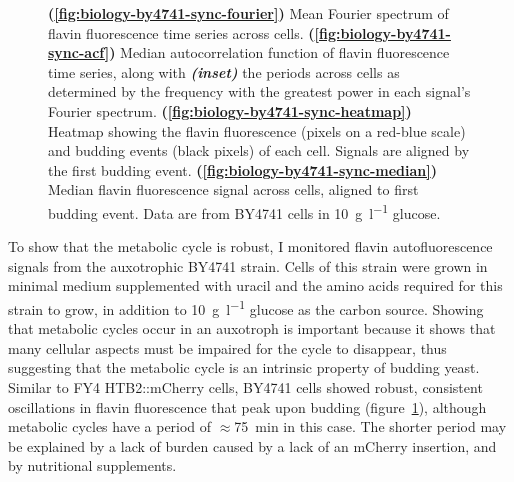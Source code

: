 \begin{figure}
  \caption[
    Mean Fourier spectrum of flavin fluorescence time series across cells.
    Median autocorrelation function of flavin fluorescence time series, along with the periods across cells.
    Heatmap showing the flavin fluorescence and budding events of each cell.
    Median flavin fluorescence signal across cells, aligned to first budding event.
    Data are from BY4741 cells in \SI{10}{\gram~\litre^{-1}} glucose.
  ]{
    \textbf{(\ref{fig:biology-by4741-sync-fourier})} Mean Fourier spectrum of flavin fluorescence time series across cells.
    \textbf{(\ref{fig:biology-by4741-sync-acf})} Median autocorrelation function of flavin fluorescence time series, along with \textit{\textbf{(inset)}} the periods across cells as determined by the frequency with the greatest power in each signal's Fourier spectrum.
    \textbf{(\ref{fig:biology-by4741-sync-heatmap})}
    Heatmap showing the flavin fluorescence (pixels on a red-blue scale) and budding events (black pixels) of each cell.
    Signals are aligned by the first budding event.
    \textbf{(\ref{fig:biology-by4741-sync-median})}
    Median flavin fluorescence signal across cells, aligned to first budding event.
    Data are from BY4741 cells in \SI{10}{\gram~\litre^{-1}} glucose.
  }
  \label{fig:biology-by4741-sync}
\end{figure}

To show that the metabolic cycle is robust,
I monitored flavin autofluorescence signals from the auxotrophic BY4741 strain.
Cells of this strain were grown in minimal medium supplemented with uracil and the amino acids required for this strain to grow, in addition to \SI{10}{\gram~\litre^{-1}} glucose as the carbon source.
Showing that metabolic cycles occur in an auxotroph is important because it shows that many cellular aspects must be impaired for the cycle to disappear, thus suggesting that the metabolic cycle is an intrinsic property of budding yeast.
Similar to FY4 HTB2::mCherry cells, BY4741 cells showed robust, consistent oscillations in flavin fluorescence that peak upon budding (figure~\ref{fig:biology-by4741-sync}), although metabolic cycles have a period of $\approx$\SI{75}{\minute} in this case.
The shorter period may be explained by a lack of burden caused by a lack of an mCherry insertion, and by nutritional supplements.


